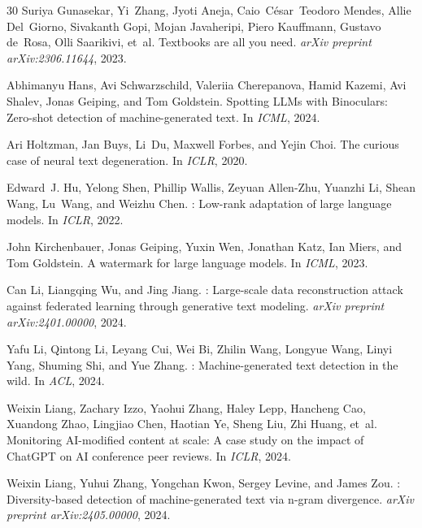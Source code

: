 \documentclass[11pt,a4paper]{article}
\begin{document}
\begin{thebibliography}{30}
Suriya Gunasekar, Yi~Zhang, Jyoti Aneja, Caio~C{\'e}sar~Teodoro Mendes, Allie Del~Giorno, Sivakanth Gopi, Mojan Javaheripi, Piero Kauffmann, Gustavo de~Rosa, Olli Saarikivi, et~al.
\newblock Textbooks are all you need.
\newblock \emph{arXiv preprint arXiv:2306.11644}, 2023.

Abhimanyu Hans, Avi Schwarzschild, Valeriia Cherepanova, Hamid Kazemi, Avi Shalev, Jonas Geiping, and Tom Goldstein.
\newblock Spotting {LLMs} with {Binoculars}: Zero-shot detection of machine-generated text.
\newblock In \emph{ICML}, 2024.

Ari Holtzman, Jan Buys, Li~Du, Maxwell Forbes, and Yejin Choi.
\newblock The curious case of neural text degeneration.
\newblock In \emph{ICLR}, 2020.

Edward~J. Hu, Yelong Shen, Phillip Wallis, Zeyuan Allen-Zhu, Yuanzhi Li, Shean Wang, Lu~Wang, and Weizhu Chen.
: Low-rank adaptation of large language models.
\newblock In \emph{ICLR}, 2022.

John Kirchenbauer, Jonas Geiping, Yuxin Wen, Jonathan Katz, Ian Miers, and Tom Goldstein.
\newblock A watermark for large language models.
\newblock In \emph{ICML}, 2023.

Can Li, Liangqing Wu, and Jing Jiang.
: Large-scale data reconstruction attack against federated learning through generative text modeling.
\newblock \emph{arXiv preprint arXiv:2401.00000}, 2024.

Yafu Li, Qintong Li, Leyang Cui, Wei Bi, Zhilin Wang, Longyue Wang, Linyi Yang, Shuming Shi, and Yue Zhang.
: Machine-generated text detection in the wild.
\newblock In \emph{ACL}, 2024.

Weixin Liang, Zachary Izzo, Yaohui Zhang, Haley Lepp, Hancheng Cao, Xuandong Zhao, Lingjiao Chen, Haotian Ye, Sheng Liu, Zhi Huang, et~al.
\newblock Monitoring {AI}-modified content at scale: A case study on the impact of {ChatGPT} on {AI} conference peer reviews.
\newblock In \emph{ICLR}, 2024.

Weixin Liang, Yuhui Zhang, Yongchan Kwon, Sergey Levine, and James Zou.
: Diversity-based detection of machine-generated text via n-gram divergence.
\newblock \emph{arXiv preprint arXiv:2405.00000}, 2024.


\end{thebibliography}
\end{document}
